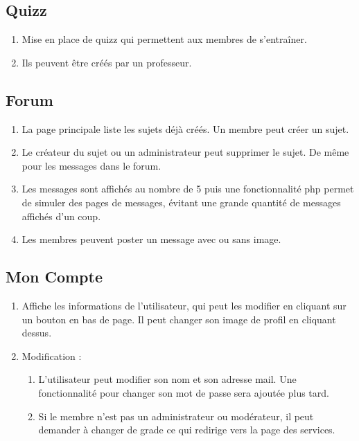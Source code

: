 \documentclass[12pt,a4paper]{article}
\begin{document}
\subsection{Quizz}
\begin{enumerate}
    \item Mise en place de quizz qui permettent aux membres de s'entraîner.
    \item Ils peuvent être créés par un professeur.
\end{enumerate}

\subsection{Forum}
\begin{enumerate}
    \item La page principale liste les sujets déjà créés. Un membre peut créer un sujet.
    \item Le créateur du sujet ou un administrateur peut supprimer le sujet. De même pour les messages dans le forum.
    \item Les messages sont affichés au nombre de 5 puis une fonctionnalité php permet de simuler des pages de messages, évitant une grande quantité de messages affichés d'un coup.
    \item Les membres peuvent poster un message avec ou sans image.
\end{enumerate}

\subsection{Mon Compte}
\begin{enumerate}
    \item Affiche les informations de l'utilisateur, qui peut les modifier en cliquant sur un bouton en bas de page. Il peut changer son image de profil en cliquant dessus.
    \item Modification :
    \begin{enumerate}
        \item L'utilisateur peut modifier son nom et son adresse mail. Une fonctionnalité pour changer son mot de passe sera ajoutée plus tard.
        \item Si le membre n'est pas un administrateur ou modérateur, il peut demander à changer de grade ce qui redirige vers la page des services.
    \end{enumerate}
\end{enumerate}
\end{document}
